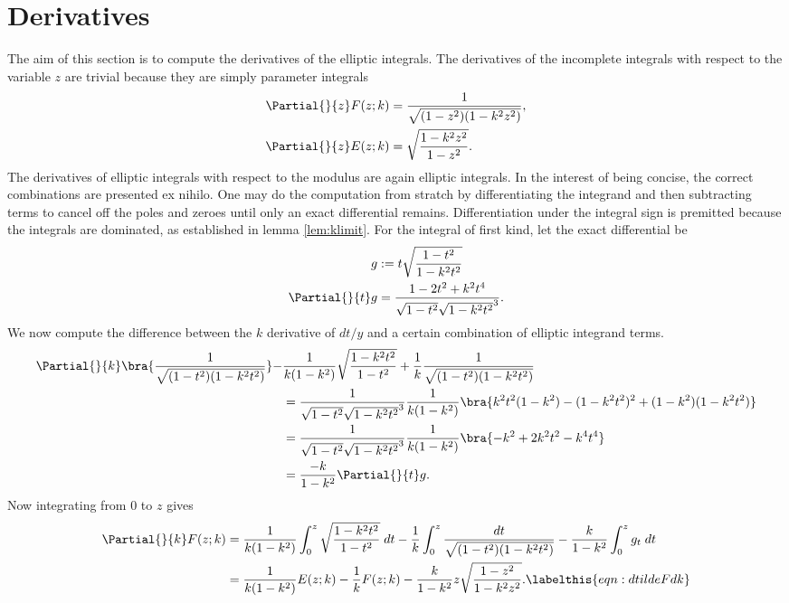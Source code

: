 \section{Derivatives}
\label{sec:Derivatives}
The aim of this section is to compute the derivatives of the elliptic integrals. The derivatives of the incomplete integrals with respect to the variable $z$ are trivial because they are simply parameter integrals
\begin{align}
    \Partial{}{z} F(z;k) &= \frac{1}{\sqrt{(1-z^2)(1-k^2 z^2)}}, \label{eqn:dFdz} \\
    \Partial{}{z} E(z;k) &= \sqrt{\frac{1-k^2 z^2}{1-z^2}}. \label{eqn:dEdz}
\end{align}
The derivatives of elliptic integrals with respect to the modulus are again elliptic integrals. In the interest of being concise, the correct combinations are presented ex nihilo. One may do the computation from stratch by differentiating the integrand and then subtracting terms to cancel off the poles and zeroes until only an exact differential remains. Differentiation under the integral sign is premitted because the integrals are dominated, as established in lemma \ref{lem:klimit}. 
For the integral of first kind, let the exact differential be
\begin{align*}
g &:= t\sqrt{\frac{1-t^2}{1-k^2t^2}} \\
\Partial{}{t} g &= \frac{1-2t^2 + k^2 t^4}{\sqrt{1-t^2}\sqrt{1-k^2t^2}^3}.
\end{align*}
We now compute the difference between the $k$ derivative of $dt/y$ and a certain combination of elliptic integrand terms.
\begin{align*}
\Partial{}{k}\bra{\frac{1}{\sqrt{(1-t^2)(1-k^2 t^2)}}} -& \frac{1}{k(1-k^2)}\sqrt{\frac{1-k^2 t^2}{1-t^2}} + \frac{1}{k}\frac{1}{\sqrt{(1-t^2)(1-k^2 t^2)}} \\
&= \frac{1}{\sqrt{1-t^2}\sqrt{1-k^2t^2}^3}\frac{1}{k(1-k^2)}\bra{ k^2t^2(1-k^2) - (1-k^2t^2)^2 + (1-k^2)(1-k^2t^2) } \\
&= \frac{1}{\sqrt{1-t^2}\sqrt{1-k^2t^2}^3}\frac{1}{k(1-k^2)}\bra{ -k^2 + 2k^2t^2 -k^4t^4} \\
&= \frac{-k}{1-k^2} \Partial{}{t} g.
\end{align*}
Now integrating from $0$ to $z$ gives
\begin{align*}
\Partial{}{k} F(z;k)
&= \frac{1}{k(1-k^2)} \int_0^z \sqrt{\frac{1-k^2 t^2}{1-t^2}} \; dt
- \frac{1}{k} \int_0^z \frac{dt}{\sqrt{(1-t^2)(1-k^2 t^2)}}
- \frac{k}{1-k^2} \int_0^z g_t \; dt \\
&= \frac{1}{k(1-k^2)} E(z;k) - \frac{1}{k} F(z;k) - \frac{k}{1-k^2}z\sqrt{\frac{1-z^2}{1-k^2z^2}}. \labelthis{eqn:dtildeFdk}
\end{align*}
